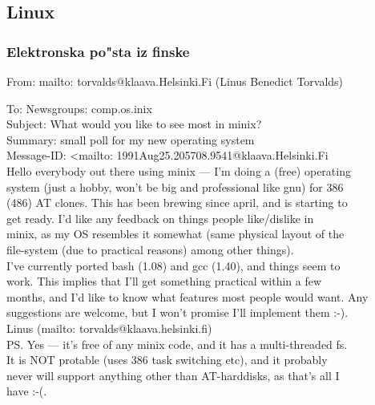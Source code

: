 \documentclass{beamer}
\begin{document}
\subsection{Linux}
\begin{frame}
\frametitle{Elektronska po"sta iz finske}
\begin{block}{}
\tiny
From: mailto: torvalds@klaava.Helsinki.Fi (Linus Benedict Torvalds)\\
\vskip0.2cm

To: Newsgroups: comp.os.inix\\
Subject: What would you like to see most in minix?\\
Summary: small poll for my new operating system\\
Message-ID: <mailto: 1991Aug25.205708.9541@klaava.Helsinki.Fi\\
Hello everybody out there using minix — I’m doing a (free) operating\\
system (just a hobby, won’t be big and professional like gnu) for 386\\
(486) AT clones. This has been brewing since april, and is starting to\\
get ready. I’d like any feedback on things people like/dislike in\\
minix, as my OS resembles it somewhat (same physical layout of the\\
file-system (due to practical reasons) among other things).\\
\vskip0.2cm
I’ve currently ported bash (1.08) and gcc (1.40), and things seem to\\
work. This implies that I’ll get something practical within a few\\
months, and I’d like to know what features most people would want. Any\\
suggestions are welcome, but I won’t promise I’ll implement them :-).\\
\vskip0.2cm
Linus (mailto: torvalds@klaava.helsinki.fi)\\
\vskip0.2cm
PS. Yes — it’s free of any minix code, and it has a multi-threaded fs.\\
It is NOT protable (uses 386 task switching etc), and it probably\\
never will support anything other than AT-harddisks, as that’s all I\\
have :-(.
\end{block}
\end{frame}
\end{document}
